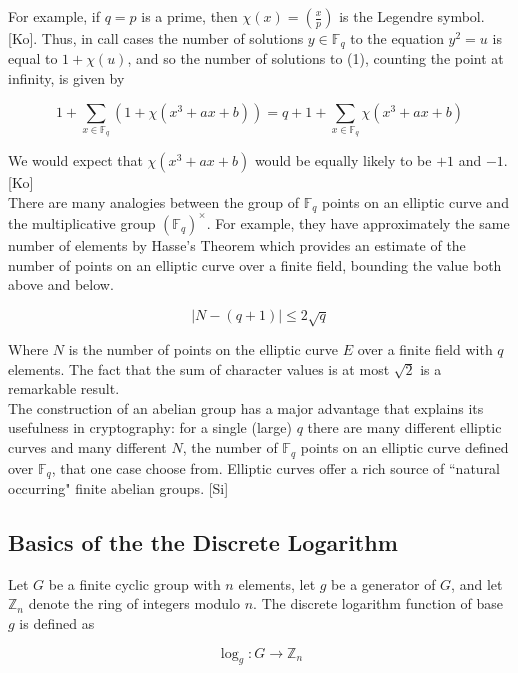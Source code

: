 \documentclass[12pt]{article}
\newcommand{\F}{\mathbb{F}}
\newcommand{\Z}{\mathbb{Z}}
\begin{document}
For example, if $q = p$ is a prime, then $\chi(x) = \left(\frac{x}{p}\right)$ is the Legendre symbol. [Ko]. Thus, in call cases the number of solutions $y \in \F_q$ to the equation $y^2 = u$ is equal to $1 + \chi(u)$, and so the number of solutions to (1), counting the point at infinity, is given by 

\begin{displaymath}
1 + \sum_{x \in \F_q}(1 + \chi(x^3 + ax + b)) = q+1 + \sum_{x \in \F_q} \chi(x^3+ax+b)
\end{displaymath}

\noindent We would expect that $\chi(x^3+ax+b)$ would be equally likely to be $+1$ and $-1$.[Ko] \\

There are many analogies between the group of $\F_q$ points on an elliptic curve and the multiplicative group $(\F_q)^{\times}$. For example, they have approximately the same number of elements by Hasse's Theorem  which provides an estimate of the number of points on an elliptic curve over a finite field, bounding the value both above and below.

\begin{displaymath}
\left|N - (q+1)\right| \leq 2\sqrt{q}
\end{displaymath}

Where $N$ is the number of points on the elliptic curve $E$ over a finite field with $q$ elements. The fact that the sum of character values is at most $\sqrt{2}$ is a remarkable result. \\

The construction of an abelian group has a major advantage that explains its usefulness in cryptography: for a single (large) $q$ there are many different elliptic curves and many different $N$, the number of $\F_q$  points on an elliptic curve defined over $\F_q$, that one case choose from. Elliptic curves offer a rich source of ``natural occurring" finite abelian groups. [Si]

\subsection{Basics of the the Discrete Logarithm}

 Let $G$ be a finite cyclic group with $n$ elements, let $g$ be a generator of $G$, and let $\Z_n$ denote the ring of integers modulo $n$. The discrete logarithm function of base $g$ is defined as 

\begin{displaymath}
\log_g : G \longrightarrow \Z_n
\end{displaymath}
\end{document}
